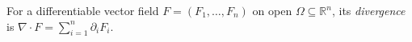 
For a differentiable vector field $F=(F_1,\ldots,F_n)$ on open $\Omega\subseteq\mathbb R^n$, its \emph{divergence} is $\nabla\cdot F=\sum_{i=1}^n\partial_iF_i$.
